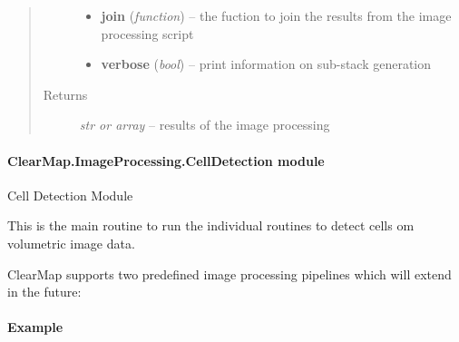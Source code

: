 \documentclass[letterpaper,10pt,english]{sphinxmanual}
\begin{document}
\begin{fulllineitems}
\begin{quote}
\begin{description}
\begin{itemize}
\item {} 
\textbf{join} (\emph{function}) --
the fuction to join the results from the image processing script

\item {} 
\textbf{verbose} (\emph{bool}) --
print information on sub-stack generation

\end{itemize}

\item[{Returns}] \leavevmode
\emph{str or array} --
results of the image processing

\end{description}\end{quote}

\end{fulllineitems}



\paragraph{ClearMap.ImageProcessing.CellDetection module}
\label{api/ClearMap.ImageProcessing:module-ClearMap.ImageProcessing.CellDetection}\label{api/ClearMap.ImageProcessing:clearmap-imageprocessing-celldetection-module}
Cell Detection Module

This is the main routine to run the individual routines to detect cells om
volumetric image data.

ClearMap supports two predefined image processing pipelines which will extend
in the future:
\paragraph{Example}
\end{document}
